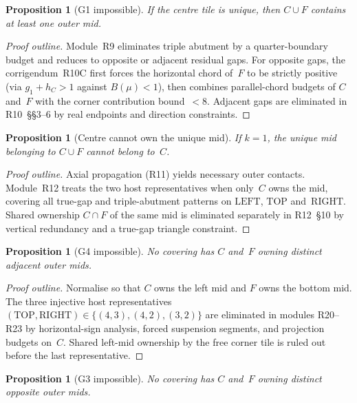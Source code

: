 \documentclass[11pt,reqno]{amsart}
\newtheorem{proposition}[theorem]{Proposition}
\theoremstyle{definition}
\newcommand{\RIGHT}{\mathrm{RIGHT}}
\newcommand{\TOP}{\mathrm{TOP}}
\newcommand{\LEFT}{\mathrm{LEFT}}
\begin{document}
\begin{proposition}[G1 impossible]\label{prop:M42}
If the centre tile is unique, then $C\cup F$ contains at least one outer mid.
\end{proposition}

\begin{proof}[Proof outline]
Module~R9 eliminates triple abutment by a quarter-boundary budget and reduces
to opposite or adjacent residual gaps.  For opposite gaps, the corrigendum~R10C
first forces the horizontal chord of~$F$ to be strictly positive (via
$g_1+h_C>1$ against $B(\mu)<1$), then combines parallel-chord budgets of $C$
and~$F$ with the corner contribution bound~$<8$.  Adjacent gaps are eliminated
in R10~\S\S3--6 by real endpoints and direction constraints.
\end{proof}

\begin{proposition}[Centre cannot own the unique mid]\label{prop:M43}
If $k=1$, the unique mid belonging to $C\cup F$ cannot belong to~$C$.
\end{proposition}

\begin{proof}[Proof outline]
Axial propagation (R11) yields necessary outer contacts.  Module~R12 treats
the two host representatives when only~$C$ owns the mid, covering all true-gap
and triple-abutment patterns on $\LEFT$, $\TOP$ and~$\RIGHT$.  Shared ownership
$C\cap F$ of the same mid is eliminated separately in R12~\S10 by vertical
redundancy and a true-gap triangle constraint.
\end{proof}

\begin{proposition}[G4 impossible]\label{prop:M51}
No covering has $C$ and~$F$ owning distinct adjacent outer mids.
\end{proposition}

\begin{proof}[Proof outline]
Normalise so that $C$ owns the left mid and $F$ owns the bottom mid.  The three
injective host representatives $(\TOP,\RIGHT)\in\{(4,3),(4,2),(3,2)\}$ are
eliminated in modules R20--R23 by horizontal-sign analysis, forced suspension
segments, and projection budgets on~$C$.  Shared left-mid ownership by the free
corner tile is ruled out before the last representative.
\end{proof}

\begin{proposition}[G3 impossible]\label{prop:M52}
No covering has $C$ and~$F$ owning distinct opposite outer mids.
\end{proposition}
\end{document}
